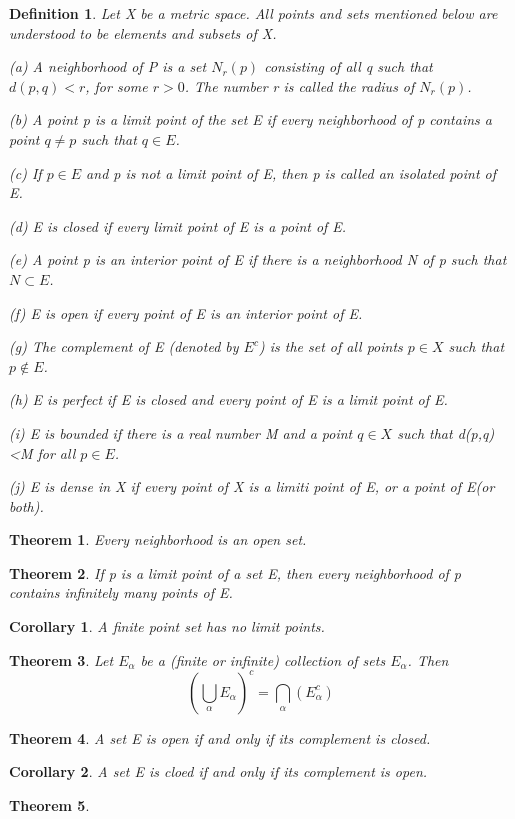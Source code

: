 \documentclass{article}
\newtheorem{defi}{Definition}
\newtheorem{theo}{Theorem}
\newtheorem{coro}{Corollary}
\begin{document}
\begin{defi}
	Let X be a metric space. All points and sets mentioned below are understood to be elements and subsets of X.
	
	(a) A neighborhood of P is a set $ N_r(p) $ consisting of all q such that $ d(p,q)<r $, for some $ r>0 $. The number r is called the radius of $ N_r(p) $.
	
	(b) A point p is a limit point of the set E if every neighborhood of p contains a point $ q\neq p $ such that $ q\in E $.
	
	(c) If $ p\in E $ and p is not a limit point of E, then p is called an isolated point of E.
	
	(d) E is closed if every limit point of E is a point of E.
	
	(e) A point p is an interior point of E if there is a neighborhood N of p such that $ N\subset E $.
	
	(f) E is open if every point of E is an interior point of E.
	
	(g) The complement of E (denoted by $ E^c $) is the set of all points $ p\in X $ such that $ p\notin E $.
	
	(h) E is perfect if E is closed and every point of E is a limit point of E.
	
	(i) E is bounded if there is a real number M and a point $ q\in X $ such that d(p,q)<M for all $ p\in E $.
	
	(j) E is dense in X if every point of X is a limiti point of E, or a point of E(or both).
	
\end{defi}

\begin{theo}
	Every neighborhood is an open set.
\end{theo}

\begin{theo}
	If p is a limit point of a set E, then every neighborhood of p contains infinitely many points of E.
\end{theo}

\begin{coro}
	A finite point set has no limit points.
\end{coro}

\begin{theo}
	Let {$ E_\alpha $} be a (finite or infinite) collection of sets $ E_\alpha $. Then
	\[
	(\bigcup_{\alpha} E_\alpha)^c=\bigcap_{\alpha}(E_\alpha^c)
	\]
\end{theo}

\begin{theo}
	A set E is open if and only if its complement is closed.
\end{theo}

\begin{coro}
	A set E is cloed if and only if its complement is open.
\end{coro}

\begin{theo}
	
\end{theo}
\end{document}
